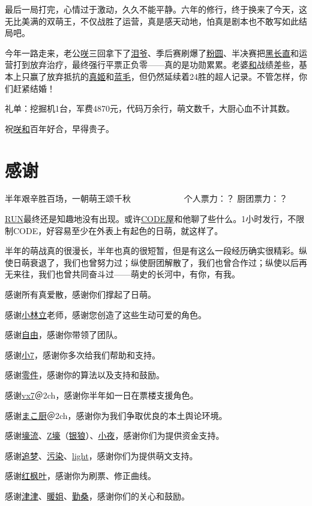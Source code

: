 最后一局打完，心情过于激动，久久不能平静。六年的修行，终于换来了今天，这无比美满的双萌王，不仅战胜了运营，真是感天动地，怕真是剧本也不敢写如此结局吧。

今年一路走来，老公\uline{咲}三回拿下了\uline{泪爷}、季后赛刷爆了\uline{粉圆}、半决赛把\uline{黑长直}和运营打到放弃治疗，最终强行平票正负零——真的是功勋累累。老婆\uline{和}战绩差些，基本上只赢了放弃抵抗的\uline{真姬}和\uline{蓝毛}，但仍然延续着24胜的超人记录。不管怎样，你们赶紧结婚！

礼单：挖掘机1台，军费4870元，代码万余行，萌文数千，大厨心血不计其数。

祝\uline{咲}\uline{和}百年好合，早得贵子。

\chapter{感谢}
\begin{center}
{\subTitle 半年艰辛胜百场，一朝萌王颂千秋}
\subMemo
　　　　　　个人票力：？ 厨团票力：？
\end{center}

\uline{RUN}最终还是知趣地没有出现。或许\uline{CODE屋}和他聊了些什么。1小时发行，不限制CODE，好容易至少在外表上有起色的日萌，就这样了。

半年的萌战真的很漫长，半年也真的很短暂，但是有这么一段经历确实很精彩。纵使日萌衰退了，我们也曾努力过；纵使厨团解散了，我们也曾合作过；纵使以后再无来往，我们也曾共同奋斗过——萌史的长河中，有你，有我。

感谢所有真爱散，感谢你们撑起了日萌。

感谢\uline{小林立}老师，感谢您创造了这些生动可爱的角色。

感谢\uline{自由}，感谢你带领了团队。

感谢\uline{小7}，感谢你多次给我们帮助和支持。

感谢\uline{零件}，感谢你的算法以及支持和鼓励。

感谢\uline{vx7}＠2ch，感谢你半年如一日在票楼支援角色。

感谢\uline{\mincho まこ厨}＠2ch，感谢你为我们争取优良的本土舆论环境。

感谢\uline{壕流}、\uline{Z壕}（\uline{银狼}）、\uline{小夜}，感谢你们为提供资金支持。

感谢\uline{追梦}、\uline{污染}、\uline{light}，感谢你们为提供萌文支持。

感谢\uline{红枫叶}，感谢你为刷票、修正曲线。

感谢\uline{津津}、\uline{暖姐}、\uline{勤桑}，感谢你们的关心和鼓励。

